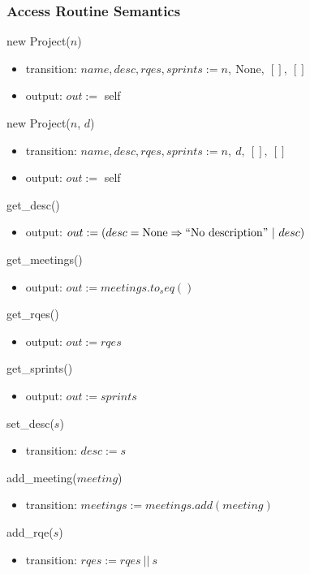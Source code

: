 \documentclass[12pt, titlepage]{article}
\begin{document}
\subsubsection*{Access Routine Semantics}
\noindent new Project($n$)
\begin{itemize}
    \item transition: $name, desc, rqes, sprints := n,\ \text{None},\ [],\ []$
    \item output: $out :=$ self
\end{itemize}

\noindent new Project($n$, $d$)
\begin{itemize}
    \item transition: $name, desc, rqes, sprints := n,\ d,\ [],\ []$
    \item output: $out :=$ self
\end{itemize}

\noindent get\_desc()
\begin{itemize}
    \item output: $out := (desc = \text{None} \Rightarrow ``\text{No description}"\ |\ desc)$
\end{itemize}

\noindent get\_meetings()
\begin{itemize}
    \item output: $out := meetings.to_seq()$
\end{itemize}

\noindent get\_rqes()
\begin{itemize}
    \item output: $out := rqes$
\end{itemize}

\noindent get\_sprints()
\begin{itemize}
    \item output: $out := sprints$
\end{itemize}

\noindent set\_desc($s$)
\begin{itemize}
    \item transition: $desc := s$
\end{itemize}

\noindent add\_meeting($meeting$)
\begin{itemize}
    \item transition: $meetings := meetings.add(meeting)$
\end{itemize}

\noindent add\_rqe($s$)
\begin{itemize}
    \item transition: $rqes := rqes\ ||\ s$
\end{itemize}
\end{document}

